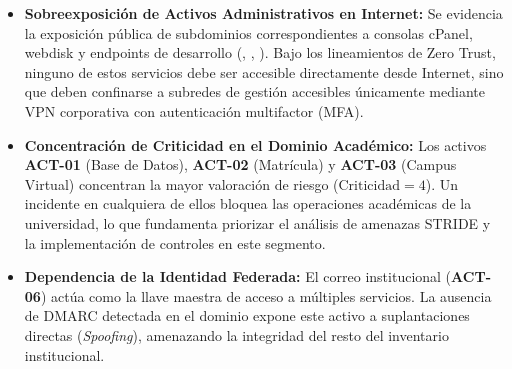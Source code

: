 \begin{itemize}[itemsep=3.5pt,topsep=2pt,parsep=0pt]
    \item \textbf{Sobreexposición de Activos Administrativos en Internet:} Se evidencia la exposición pública de subdominios correspondientes a consolas cPanel, webdisk y endpoints de desarrollo (, , ). Bajo los lineamientos de Zero Trust, ninguno de estos servicios debe ser accesible directamente desde Internet, sino que deben confinarse a subredes de gestión accesibles únicamente mediante VPN corporativa con autenticación multifactor (MFA).

    \item \textbf{Concentración de Criticidad en el Dominio Académico:} Los activos \textbf{ACT-01} (Base de Datos), \textbf{ACT-02} (Matrícula) y \textbf{ACT-03} (Campus Virtual) concentran la mayor valoración de riesgo ($\text{Criticidad}=4$). Un incidente en cualquiera de ellos bloquea las operaciones académicas de la universidad, lo que fundamenta priorizar el análisis de amenazas STRIDE y la implementación de controles en este segmento.

    \item \textbf{Dependencia de la Identidad Federada:} El correo institucional (\textbf{ACT-06}) actúa como la llave maestra de acceso a múltiples servicios. La ausencia de DMARC detectada en el dominio  expone este activo a suplantaciones directas (\textit{Spoofing}), amenazando la integridad del resto del inventario institucional.
\end{itemize}
